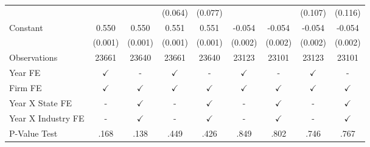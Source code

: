 {\begin{tabular}{l*{8}{c}}
                    &                     &                     &     (0.064)         &     (0.077)         &                     &                     &     (0.107)         &     (0.116)         \\
Constant            &       0.550\sym{***}&       0.550\sym{***}&       0.551\sym{***}&       0.551\sym{***}&      -0.054\sym{***}&      -0.054\sym{***}&      -0.054\sym{***}&      -0.054\sym{***}\\
                    &     (0.001)         &     (0.001)         &     (0.001)         &     (0.001)         &     (0.002)         &     (0.002)         &     (0.002)         &     (0.002)         \\
\midrule
Observations        &       23661         &       23640         &       23661         &       23640         &       23123         &       23101         &       23123         &       23101         \\
Year FE             &$\checkmark$         &           -         &$\checkmark$         &           -         &$\checkmark$         &           -         &$\checkmark$         &           -         \\
Firm FE             &$\checkmark$         &$\checkmark$         &$\checkmark$         &$\checkmark$         &$\checkmark$         &$\checkmark$         &$\checkmark$         &$\checkmark$         \\
Year X State FE     &           -         &$\checkmark$         &           -         &$\checkmark$         &           -         &$\checkmark$         &           -         &$\checkmark$         \\
Year X Industry FE  &           -         &$\checkmark$         &           -         &$\checkmark$         &           -         &$\checkmark$         &           -         &$\checkmark$         \\
P-Value Test        &        .168         &        .138         &        .449         &        .426         &        .849         &        .802         &        .746         &        .767         \\
\bottomrule
\end{tabular}
}
